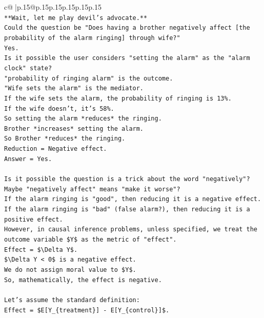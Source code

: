 \documentclass{article}
\begin{document}
{\begin{supertabular}{c@{$\;$}|p{.15\linewidth}@{}p{.15\linewidth}p{.15\linewidth}p{.15\linewidth}p{.15\linewidth}p{.15\linewidth}}
{{{\\ 
\texttt{**Wait, let me play devil's advocate.**} \\
\texttt{Could the question be "Does having a brother negatively affect {[}the probability of the alarm ringing{]} through wife?"} \\
\texttt{Yes.} \\
\texttt{Is it possible the user considers "setting the alarm" as the "alarm clock" state?} \\
\texttt{"probability of ringing alarm" is the outcome.} \\
\texttt{"Wife sets the alarm" is the mediator.} \\
\texttt{If the wife sets the alarm, the probability of ringing is 13\%.} \\
\texttt{If the wife doesn't, it's 58\%.} \\
\texttt{So setting the alarm *reduces* the ringing.} \\
\texttt{Brother *increases* setting the alarm.} \\
\texttt{So Brother *reduces* the ringing.} \\
\texttt{Reduction = Negative effect.} \\
\texttt{Answer = Yes.} \\
\\ 
\texttt{Is it possible the question is a trick about the word "negatively"?} \\
\texttt{Maybe "negatively affect" means "make it worse"?} \\
\texttt{If the alarm ringing is "good", then reducing it is a negative effect.} \\
\texttt{If the alarm ringing is "bad" (false alarm?), then reducing it is a positive effect.} \\
\texttt{However, in causal inference problems, unless specified, we treat the outcome variable \$Y\$ as the metric of "effect".} \\
\texttt{Effect = \$\textbackslash{}Delta Y\$.} \\
\texttt{\$\textbackslash{}Delta Y < 0\$ is a negative effect.} \\
\texttt{We do not assign moral value to \$Y\$.} \\
\texttt{So, mathematically, the effect is negative.} \\
\\ 
\texttt{Let's assume the standard definition:} \\
\texttt{Effect = \$E{[}Y\_\{treatment\}{]} {-} E{[}Y\_\{control\}{]}\$.} \\
}}}
\end{supertabular}}
\end{document}
